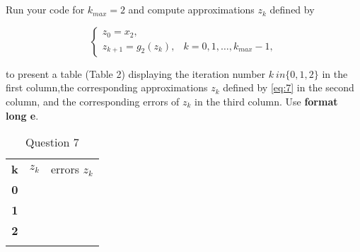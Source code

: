 \documentclass{article}
\begin{document}
\section{}
Run your code for $k_{max}=2$ and compute approximations $z_k$ defined by

\begin{equation}\label{eq:7}
    \begin{cases}
    z_0 = x_2,\\
    z_{k+1}=g_2(z_k), & k=0,1,\dots , k_{max}-1,
    \end{cases}
\end{equation}

to present a table (Table 2) displaying the iteration number $k \ in \{0,1,2\}$ in the first column,the corresponding approximations $z_k$ defined by \ref{eq:7} in the second  column, and the corresponding errors of $z_k$ in the third column. Use {\selectfont \textbf{format long e}}.
\vspace{10mm}

\begin{table}[H]
    \centering
    \begin{tabular}{|c|c|c|}
    \Xhline{1pt}
    \textbf{k} &$z_k$    & \makecell{errors \\ $z_k$}  \\
    \Xhline{2 pt}
    \textbf{0}   & & \\
    \Xhline{1 pt}
    \textbf{1}   & & \\
    \Xhline{1 pt}
    \textbf{2}   & & \\
    \Xhline{1 pt}
    \end{tabular}
    \caption{Question 7}
    \label{tab:q7}
\end{table}
\end{document}
